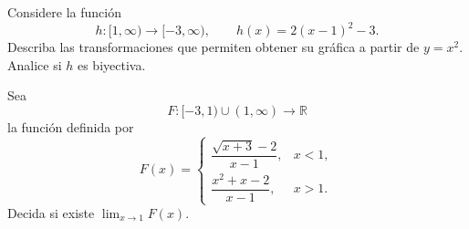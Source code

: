 \documentclass[10pt,a5paper]{article}
\newif\ifmostrarSoluciones
\newenvironment{solucionejercicio}[1]{%
  \par\medskip\noindent\textbf{Solución del ejercicio #1.}%
  \enspace\ignorespaces
}{%
  \par\medskip
}
\begin{document}
\begin{ejerciciopractica}
  Considere la función
  \[
    h\colon[1,\infty)\longrightarrow[-3,\infty),
    \qquad
    h(x)=2(x-1)^2-3.
  \]
  Describa las transformaciones que permiten obtener su gráfica a partir de $y=x^2$. Analice si $h$ es biyectiva.
\end{ejerciciopractica}

\ifmostrarSoluciones
\begin{solucionejercicio}{2}
  Partimos de la función básica
  \[
    y=x^2.
  \]
  Al reemplazar $x$ por $x-1$, su gráfica se traslada una unidad hacia la
  derecha. La multiplicación por $2$ produce un estiramiento vertical de factor
  $2$, y la resta de $3$ traslada la gráfica tres unidades hacia abajo. En
  consecuencia, el vértice es
  \[
    (1,-3),
  \]
  y solo se considera la rama correspondiente a $x\geq1$.

  Probemos primero la inyectividad. Sean $x_1,x_2\in[1,\infty)$ y supongamos
  que
  \[
    h(x_1)=h(x_2).
  \]
  Entonces
  \begin{align*}
    2(x_1-1)^2-3&=2(x_2-1)^2-3,\\
    (x_1-1)^2&=(x_2-1)^2.
  \end{align*}
  Como $x_1-1$ y $x_2-1$ son no negativos, se sigue que
  \[
    x_1-1=x_2-1,
  \]
  y, por tanto, $x_1=x_2$. Esto demuestra que $h$ es inyectiva.

  Para probar la sobreyectividad, sea $y\in[-3,\infty)$. Buscamos
  $x\in[1,\infty)$ tal que $h(x)=y$. Al resolver esta ecuación obtenemos
  \[
    2(x-1)^2-3=y
    \iff
    x=1+\sqrt{\frac{y+3}{2}}.
  \]
  Esta elección está bien definida porque $y+3\geq0$, pertenece a
  $[1,\infty)$ y satisface $h(x)=y$. Por ello, $h$ es sobreyectiva sobre el
  codominio declarado. Como es inyectiva y sobreyectiva, concluimos que
  \[
    h\colon[1,\infty)\to[-3,\infty)
  \]
  es biyectiva.
\end{solucionejercicio}
\fi

\begin{ejerciciopractica}
  Sea
  \[
    F\colon[-3,1)\cup(1,\infty)\longrightarrow\mathbb{R}
  \]
  la función definida por
  \[
    F(x)=
    \begin{cases}
      \dfrac{\sqrt{x+3}-2}{x-1}, & x<1,\\[4mm]
      \dfrac{x^2+x-2}{x-1}, & x>1.
    \end{cases}
  \]
  Decida si existe $\displaystyle\lim_{x\to1}F(x)$.
\end{ejerciciopractica}
\end{document}

